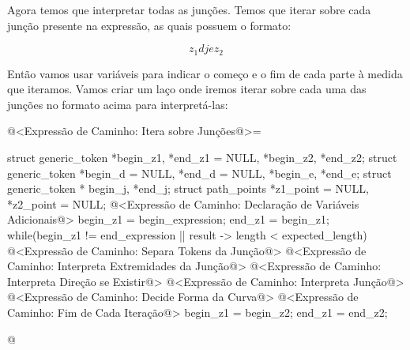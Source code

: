 Agora temos que interpretar todas as junções. Temos que iterar sobre
cada junção presente na expressão, as quais possuem o formato:

$$
z_1{d} j {e}z_2
$$

Então vamos usar variáveis para indicar o começo e o fim de cada parte
à medida que iteramos. Vamos criar um laço onde iremos iterar sobre
cada uma das junções no formato acima para interpretá-las:

\iniciocodigo
@<Expressão de Caminho: Itera sobre Junções@>=
{
  struct generic_token *begin_z1, *end_z1 = NULL, *begin_z2, *end_z2;
  struct generic_token *begin_d = NULL, *end_d = NULL, *begin_e, *end_e;
  struct generic_token * begin_j, *end_j;
  struct path_points *z1_point = NULL, *z2_point = NULL;
  @<Expressão de Caminho: Declaração de Variáveis Adicionais@>
  begin_z1 = begin_expression;
  end_z1 = begin_z1;
  while(begin_z1 != end_expression || result -> length < expected_length){
    @<Expressão de Caminho: Separa Tokens da Junção@>
    @<Expressão de Caminho: Interpreta Extremidades da Junção@>
    @<Expressão de Caminho: Interpreta Direção se Existir@>
    @<Expressão de Caminho: Interpreta Junção@>
    @<Expressão de Caminho: Decide Forma da Curva@>
    @<Expressão de Caminho: Fim de Cada Iteração@>
    begin_z1 = begin_z2;
    end_z1 = end_z2;
  }
  
}
@
\fimcodigo

